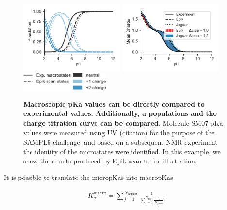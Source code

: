 \documentclass[9pt,lineno,final]{elife}
\begin{document}
\begin{figure}[H]
    \hfill
	\includegraphics[width=0.47\textwidth]{fig2_population_sm14.pdf}
	\includegraphics[width=0.47\textwidth]{fig2_charge_sm14.pdf} \\
 	\includegraphics[width=0.4\textwidth]{fig2_legend}
		\caption{{\bf Macroscopic pKa values can be directly compared to experimental values. Additionally, a populations and the charge titration curve can be compared.} Molecule SM07 pKa values were measured using UV (citation) for the purpose of the SAMPL6 challenge, and based on a subsequent NMR experiment the identity of the microstates were identified. In this example, we show the results produced by Epik scan to for illustration.
	\label{fig:scan-prediction}}
	
\end{figure}


It is possible to translate the micropKas into macropKas
\cite{Bochevarov2016multiconformation, Philipp2018macropka}

\begin{align}
 K_a^\text{macro} = \sum_{j=1}^{N_\text{deprot}} \frac{1}{\sum_{i=1}^{N_\text{prot}}\frac{1}{ K_{ij^\text{micro}}}} \label{eq:macropka}
 \end{align}

 

 
\end{document}
